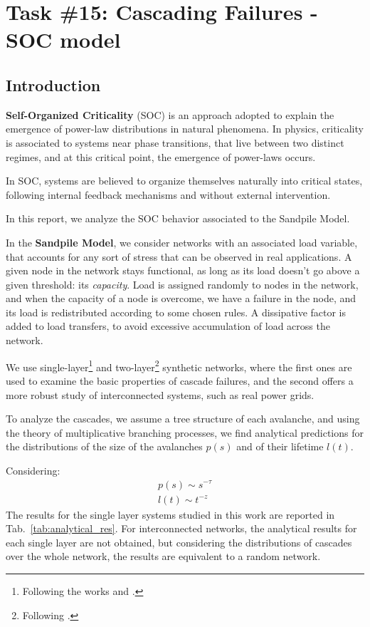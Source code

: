 \chapter{Task \#15: Cascading Failures - SOC model }
\section{Introduction}

\textbf{Self-Organized Criticality} (SOC) is an approach adopted to explain the emergence of power-law distributions in natural phenomena. 
In physics, criticality is associated to systems near phase transitions, that live between two distinct regimes, 
and at this critical point, the emergence of power-laws occurs.

\noindent In SOC, systems are believed to organize themselves naturally into critical states, following internal feedback mechanisms and without external intervention.


\noindent In this report, we analyze the SOC behavior associated to the Sandpile Model.

\noindent In the \textbf{Sandpile Model}, we consider networks with an associated load variable, that accounts for any sort of stress that can be observed in real applications. 
A given node in the network stays functional, as long as its load doesn't go above a given threshold: its \textit{capacity}. 
Load is assigned randomly to nodes in the network, and when the capacity of a node is overcome, we have a failure in the node, and its load is redistributed according to some chosen rules. 
A dissipative factor is added to load transfers, to avoid excessive accumulation of load across the network.

\noindent We use single-layer\footnote{ Following the works \cite{doi:10.1143/JPSJ.64.327} and \cite{PhysRevLett.91.148701}.} and two-layer\footnote{ Following \cite{doi:10.1073/pnas.1110586109}.} synthetic networks, where the first ones are used to examine the basic properties of cascade failures, 
and the second offers a more robust study of interconnected systems, such as real power grids.

\noindent To analyze the cascades, we assume a tree structure of each avalanche, and using the theory of multiplicative branching processes, 
we find analytical predictions for the distributions of the size of the avalanches $p(s)$ and of their lifetime $l(t)$.


\noindent Considering:
\begin{gather}
    p(s)\sim s^{-\tau}
    \\
    l(t)\sim t^{-z}
\end{gather}
The results for the single layer systems studied in this work are reported in Tab.~\ref{tab:analytical_res}. 
For interconnected networks, the analytical results for each single layer are not obtained, but considering the distributions of cascades over the whole network, 
the results are equivalent to a random network.

